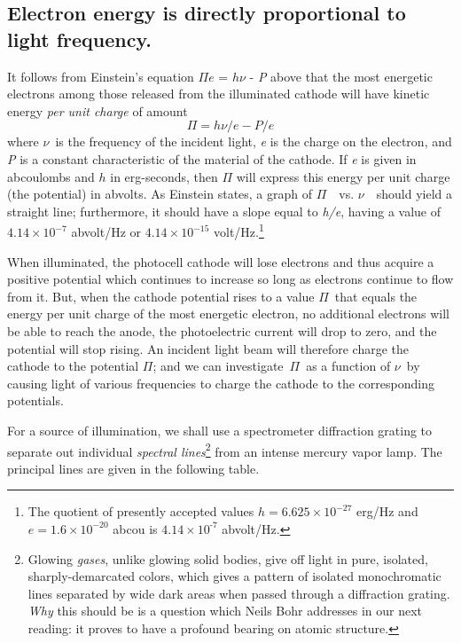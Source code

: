\subsection{Electron energy is directly proportional to light frequency.}

It follows from Einstein's equation $\Pi e$ = $h\nu$ - \emph{P}
above that the most energetic electrons among those released from the
illuminated cathode will have kinetic energy \emph{per unit charge} of
amount
\begin{equation*}
\Pi = h\nu/e - P/e
\end{equation*}
where $\nu$~is the frequency of the incident light, \emph{e} is the
charge on the electron, and \emph{P} is a constant characteristic of the
material of the cathode. If \emph{e} is given in abcoulombs and $h$
in erg-seconds, then $\Pi$ will express this energy per unit charge
(the potential) in abvolts. As Einstein states, a
graph of $\Pi$~~vs. $\nu$~~should yield a straight line;
furthermore, it should have a slope equal to \emph{h/e}, having a value
of $4.14\!\times\!10^{-7}$ abvolt/Hz or $4.14\!\times\!10^{-15}$ volt/Hz.\footnote{The
  quotient of presently accepted values $h = 6.625\!\times\!10^{-27}$ erg/Hz
  and $e = 1.6\!\times\!10^{-20}$ abcou is $4.14\!\times\!10^{‑7}$ abvolt/Hz.}

When illuminated, the photocell cathode will lose electrons and thus
acquire a positive potential which continues to increase so long as
electrons continue to flow from it. But, when the cathode potential
rises to a value $\Pi$~that equals the energy per unit charge of the
most energetic electron, no additional electrons will be able to reach
the anode, the photoelectric current will drop to zero, and the
potential will stop rising. An incident light beam will therefore charge
the cathode to the potential $\Pi$; and we can
investigate~$\Pi$~as a function of $\nu$~by causing light of
various frequencies to charge the cathode to the corresponding
potentials.

For a source of illumination, we shall use a spectrometer diffraction
grating to separate out individual \emph{spectral lines}\footnote{Glowing
  \emph{gases}, unlike glowing solid bodies, give off light in pure,
  isolated, sharply-demarcated colors, which gives a pattern of isolated
  monochromatic lines separated by wide dark areas when passed through a
  diffraction grating. \emph{Why} this should be is a question which
  Neils Bohr addresses in our next reading: it proves to have a profound
  bearing on atomic structure.} from an intense mercury vapor lamp. The
principal lines are given in the following table.



